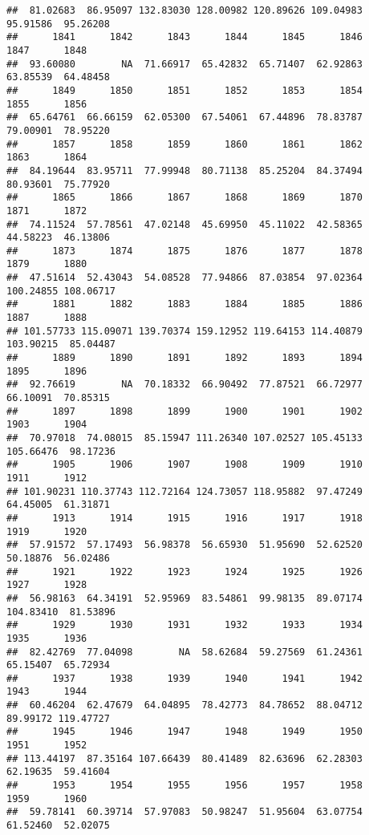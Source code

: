 \documentclass[
]{article}
\begin{document}
\begin{verbatim}
##  81.02683  86.95097 132.83030 128.00982 120.89626 109.04983  95.91586  95.26208 
##      1841      1842      1843      1844      1845      1846      1847      1848 
##  93.60080        NA  71.66917  65.42832  65.71407  62.92863  63.85539  64.48458 
##      1849      1850      1851      1852      1853      1854      1855      1856 
##  65.64761  66.66159  62.05300  67.54061  67.44896  78.83787  79.00901  78.95220 
##      1857      1858      1859      1860      1861      1862      1863      1864 
##  84.19644  83.95711  77.99948  80.71138  85.25204  84.37494  80.93601  75.77920 
##      1865      1866      1867      1868      1869      1870      1871      1872 
##  74.11524  57.78561  47.02148  45.69950  45.11022  42.58365  44.58223  46.13806 
##      1873      1874      1875      1876      1877      1878      1879      1880 
##  47.51614  52.43043  54.08528  77.94866  87.03854  97.02364 100.24855 108.06717 
##      1881      1882      1883      1884      1885      1886      1887      1888 
## 101.57733 115.09071 139.70374 159.12952 119.64153 114.40879 103.90215  85.04487 
##      1889      1890      1891      1892      1893      1894      1895      1896 
##  92.76619        NA  70.18332  66.90492  77.87521  66.72977  66.10091  70.85315 
##      1897      1898      1899      1900      1901      1902      1903      1904 
##  70.97018  74.08015  85.15947 111.26340 107.02527 105.45133 105.66476  98.17236 
##      1905      1906      1907      1908      1909      1910      1911      1912 
## 101.90231 110.37743 112.72164 124.73057 118.95882  97.47249  64.45005  61.31871 
##      1913      1914      1915      1916      1917      1918      1919      1920 
##  57.91572  57.17493  56.98378  56.65930  51.95690  52.62520  50.18876  56.02486 
##      1921      1922      1923      1924      1925      1926      1927      1928 
##  56.98163  64.34191  52.95969  83.54861  99.98135  89.07174 104.83410  81.53896 
##      1929      1930      1931      1932      1933      1934      1935      1936 
##  82.42769  77.04098        NA  58.62684  59.27569  61.24361  65.15407  65.72934 
##      1937      1938      1939      1940      1941      1942      1943      1944 
##  60.46204  62.47679  64.04895  78.42773  84.78652  88.04712  89.99172 119.47727 
##      1945      1946      1947      1948      1949      1950      1951      1952 
## 113.44197  87.35164 107.66439  80.41489  82.63696  62.28303  62.19635  59.41604 
##      1953      1954      1955      1956      1957      1958      1959      1960 
##  59.78141  60.39714  57.97083  50.98247  51.95604  63.07754  61.52460  52.02075 

\end{verbatim}
\end{document}
